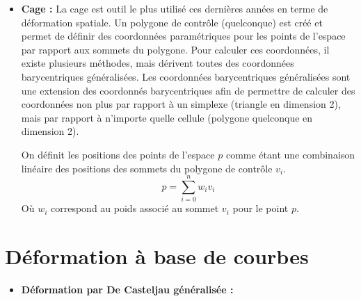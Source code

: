 \begin{itemize}
\item{\textbf{Cage :}} La cage est outil le plus utilisé ces dernières
  années en terme de déformation spatiale. Un polygone de contrôle
  (quelconque) est créé et permet de définir des coordonnées
  paramétriques pour les points de l'espace par rapport aux sommets du
  polygone. Pour calculer ces coordonnées, il existe plusieurs
  méthodes, mais dérivent toutes des coordonnées barycentriques
  généralisées. Les coordonnées barycentriques généralisées sont une
  extension des coordonnés barycentriques afin de permettre de
  calculer des coordonnées non plus par rapport à un simplexe
  (triangle en dimension 2), mais par rapport à n'importe quelle
  cellule (polygone quelconque en dimension 2).

  On définit les positions des points de l'espace $p$ comme étant une
  combinaison linéaire des positions des sommets du polygone de
  contrôle $v_i$.
  \begin{equation}
    p = \sum_{i=0}^n w_iv_i
  \end{equation}
  Où $w_i$ correspond au poids associé au sommet $v_i$ pour le point
  $p$.
\end{itemize}

\section{Déformation à base de courbes}
\begin{itemize}
\item{\textbf{Déformation par De Casteljau généralisée :}} 
\end{itemize}

